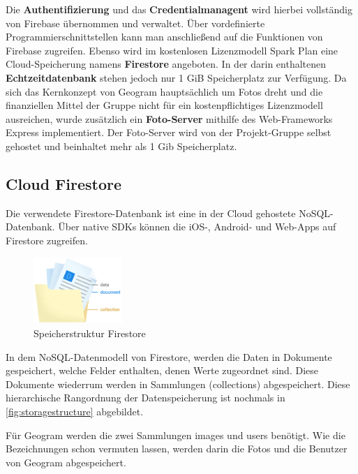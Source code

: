 Die \textbf{Authentifizierung} und das \textbf{Credentialmanagent} wird hierbei vollständig von Firebase übernommen und verwaltet. Über vordefinierte Programmierschnittstellen kann man anschließend auf die Funktionen von Firebase zugreifen. Ebenso wird im kostenlosen Lizenzmodell \glqq Spark Plan\grqq{} eine Cloud-Speicherung namens \glqq \textbf{Firestore}\grqq{} angeboten. In der darin enthaltenen \textbf{Echtzeitdatenbank} stehen jedoch nur 1 GiB Speicherplatz zur Verfügung. Da sich das Kernkonzept von Geogram hauptsächlich um Fotos dreht und die finanziellen Mittel der Gruppe nicht für ein kostenpflichtiges Lizenzmodell ausreichen, wurde zusätzlich ein \textbf{Foto-Server} mithilfe des Web-Frameworks \glqq Express\grqq{} implementiert. Der Foto-Server wird von der Projekt-Gruppe selbst gehostet und beinhaltet mehr als 1 Gib Speicherplatz.

\subsection{Cloud Firestore\label{sup3.2.1:Unterpunkt-1}}

Die verwendete Firestore-Datenbank ist eine in der Cloud gehostete NoSQL-Datenbank. Über native SDKs können die iOS-, Android- und Web-Apps auf Firestore zugreifen.

\begin{figure}
    \begin{center}
        \includegraphics[width=0.3\textwidth]{images/firestore.png}
    \end{center}
    \caption{Speicherstruktur Firestore}
    \label{fig:storagestructure}
\end{figure}

In dem NoSQL-Datenmodell von Firestore, werden die Daten in Dokumente gespeichert, welche Felder enthalten, denen Werte zugeordnet sind. Diese Dokumente wiederrum werden in Sammlungen (collections) abgespeichert. Diese hierarchische Rangordnung der Datenspeicherung ist nochmals in \autoref{fig:storagestructure} abgebildet.

Für Geogram werden die zwei Sammlungen \glqq images\grqq{} und \glqq users\grqq{} benötigt. Wie die Bezeichnungen schon vermuten lassen, werden darin die Fotos und die Benutzer von Geogram abgespeichert.


